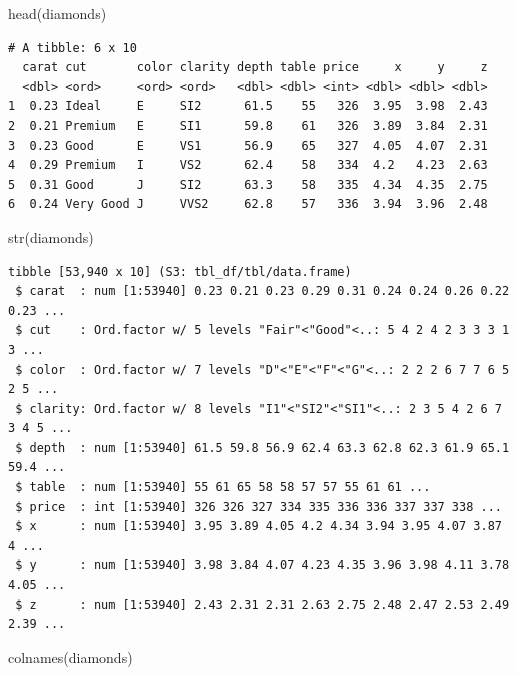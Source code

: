 \documentclass[
  letterpaper,
  DIV=11,
  numbers=noendperiod]{scrreprt}
\newenvironment{Shaded}{\begin{snugshade}}{\end{snugshade}}
\newcommand{\FunctionTok}[1]{\textcolor[rgb]{0.28,0.35,0.67}{#1}}
\newcommand{\NormalTok}[1]{\textcolor[rgb]{0.00,0.23,0.31}{#1}}
\begin{document}
\begin{Shaded}
\begin{Highlighting}[]
\FunctionTok{head}\NormalTok{(diamonds)}
\end{Highlighting}
\end{Shaded}

\begin{verbatim}
# A tibble: 6 x 10
  carat cut       color clarity depth table price     x     y     z
  <dbl> <ord>     <ord> <ord>   <dbl> <dbl> <int> <dbl> <dbl> <dbl>
1  0.23 Ideal     E     SI2      61.5    55   326  3.95  3.98  2.43
2  0.21 Premium   E     SI1      59.8    61   326  3.89  3.84  2.31
3  0.23 Good      E     VS1      56.9    65   327  4.05  4.07  2.31
4  0.29 Premium   I     VS2      62.4    58   334  4.2   4.23  2.63
5  0.31 Good      J     SI2      63.3    58   335  4.34  4.35  2.75
6  0.24 Very Good J     VVS2     62.8    57   336  3.94  3.96  2.48
\end{verbatim}

\begin{Shaded}
\begin{Highlighting}[]
\FunctionTok{str}\NormalTok{(diamonds)}
\end{Highlighting}
\end{Shaded}

\begin{verbatim}
tibble [53,940 x 10] (S3: tbl_df/tbl/data.frame)
 $ carat  : num [1:53940] 0.23 0.21 0.23 0.29 0.31 0.24 0.24 0.26 0.22 0.23 ...
 $ cut    : Ord.factor w/ 5 levels "Fair"<"Good"<..: 5 4 2 4 2 3 3 3 1 3 ...
 $ color  : Ord.factor w/ 7 levels "D"<"E"<"F"<"G"<..: 2 2 2 6 7 7 6 5 2 5 ...
 $ clarity: Ord.factor w/ 8 levels "I1"<"SI2"<"SI1"<..: 2 3 5 4 2 6 7 3 4 5 ...
 $ depth  : num [1:53940] 61.5 59.8 56.9 62.4 63.3 62.8 62.3 61.9 65.1 59.4 ...
 $ table  : num [1:53940] 55 61 65 58 58 57 57 55 61 61 ...
 $ price  : int [1:53940] 326 326 327 334 335 336 336 337 337 338 ...
 $ x      : num [1:53940] 3.95 3.89 4.05 4.2 4.34 3.94 3.95 4.07 3.87 4 ...
 $ y      : num [1:53940] 3.98 3.84 4.07 4.23 4.35 3.96 3.98 4.11 3.78 4.05 ...
 $ z      : num [1:53940] 2.43 2.31 2.31 2.63 2.75 2.48 2.47 2.53 2.49 2.39 ...
\end{verbatim}

\begin{Shaded}
\begin{Highlighting}[]
\FunctionTok{colnames}\NormalTok{(diamonds)}
\end{Highlighting}
\end{Shaded}
\end{document}
